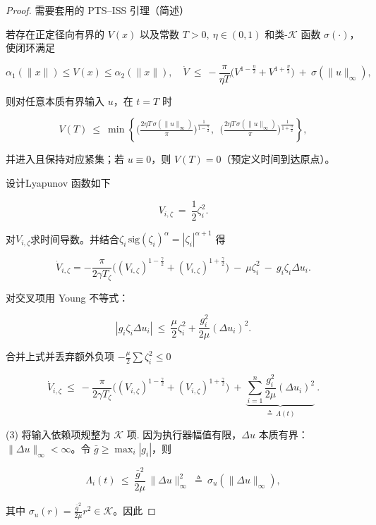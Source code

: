 \documentclass[pdflatex,sn-mathphys-num]{sn-jnl}%
\theoremstyle{thmstyleone}%
\theoremstyle{thmstyletwo}%
\theoremstyle{thmstylethree}%
\begin{document}
	\begin{proof}
	
	
	 需要套用的 PTS–ISS 引理（简述）
	
	若存在正定径向有界的 $V(x)$ 以及常数 $T>0,\ \eta\in(0,1)$ 和类-$\mathcal K$ 函数 $\sigma(\cdot)$，使闭环满足
	
	$$
	\alpha_1(\|x\|)\le V(x)\le \alpha_2(\|x\|),\quad
	\dot V \ \le\ -\frac{\pi}{\eta T}\Big(V^{1-\frac{\eta}{2}}+V^{1+\frac{\eta}{2}}\Big)\ +\ \sigma(\|u\|_\infty),
	$$
	
	则对任意本质有界输入 $u$，在 $t=T$ 时
	
	$$
	V(T)\ \le\ \min\!\left\{
	\Big(\tfrac{2\eta T\,\sigma(\|u\|_\infty)}{\pi}\Big)^{\!\frac{1}{1-\frac{\eta}{2}}},
	\ \ 
	\Big(\tfrac{2\eta T\,\sigma(\|u\|_\infty)}{\pi}\Big)^{\!\frac{1}{1+\frac{\eta}{2}}}
	\right\},
	$$
	
	并进入且保持对应紧集；若 $u\equiv0$，则 $V(T)=0$（预定义时间到达原点）。
	
	设计Lyapunov 函数如下
	
	$$
	V_{i,\zeta}\ =\ \frac12\zeta_i^2.
	$$
	
	对$V_{i,\zeta}$求时间导数。并结合$\zeta_i\,\mathrm{sig}(\zeta_i)^\alpha=|\zeta_i|^{\alpha+1}$ 得
	
	$$
	\dot V_{i,\zeta}= -\frac{\pi}{2\gamma T_\zeta}\Big((V_{i,\zeta})^{1-\frac{\gamma}{2}}+(V_{i,\zeta})^{1+\frac{\gamma}{2}}\Big)\ -\ \mu\zeta_i^2\ -\  g_i\zeta_i\Delta u_i.
	$$
	
	
	
	对交叉项用 Young 不等式：
	
	$$
	|g_i\zeta_i\Delta u_i|\ \le\ \frac{\mu}{2}\zeta_i^2+\frac{g_i^2}{2\mu}(\Delta u_i)^2 .
	$$
	
	合并上式并丢弃额外负项 $-\frac{\mu}{2}\sum\zeta_i^2\le0$
	
	$$
	\boxed{
	\dot V_{i,\zeta}
	\ \le\
	-\frac{\pi}{2\gamma T_\zeta}\Big((V_{i,\zeta})^{1-\frac{\gamma}{2}}+(V_{i,\zeta})^{1+\frac{\gamma}{2}}\Big)
	\ +\ \underbrace{\sum_{i=1}^{n}\frac{g_i^2}{2\mu}(\Delta u_i)^2}_{\displaystyle \triangleq\ \Lambda(t)}\ .
	}
	$$
	
	(3) 将输入依赖项规整为 $\mathcal K$ 项.
	因为执行器幅值有限，$\Delta u$ 本质有界：$\|\Delta u\|_\infty<\infty$。令 $\bar g\ge \max_i|g_i|$，则
	
	$$
	\Lambda_i(t)\ \le\ \frac{\bar g^2}{2\mu}\,\|\Delta u\|_\infty^2\ \triangleq\ \sigma_u(\|\Delta u\|_\infty),
	$$
	
	其中 $\sigma_u(r)=\frac{\bar g^2}{2\mu} r^2\in\mathcal K$。因此
	

\end{proof}
\end{document}
